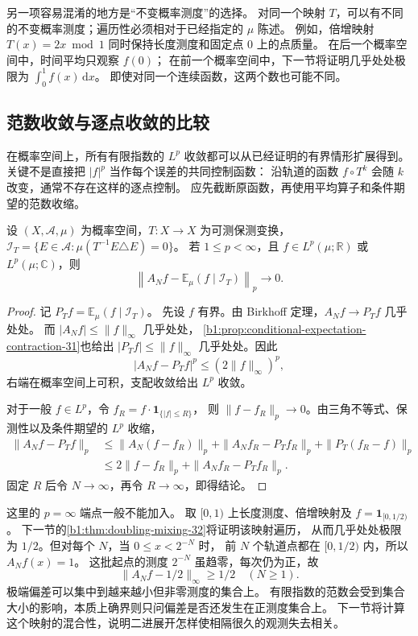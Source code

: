 另一项容易混淆的地方是“不变概率测度”的选择。
对同一个映射 \(T\)，可以有不同的不变概率测度；遍历性必须相对于已经指定的 \(\mu\) 陈述。
例如，倍增映射 \(T(x)=2x\bmod1\) 同时保持长度测度和固定点 \(0\) 上的点质量。
在后一个概率空间中，时间平均只观察 \(f(0)\)；
在前一个概率空间中，下一节将证明几乎处处极限为 \(\int_0^1f(x)\,\mathrm dx\)。
即使对同一个连续函数，这两个数也可能不同。

\subsection{范数收敛与逐点收敛的比较}
\label{b1:subsec:320404}

在概率空间上，所有有限指数的 \(L^p\) 收敛都可以从已经证明的有界情形扩展得到。
关键不是直接把 \(|f|^p\) 当作每个误差的共同控制函数：
沿轨道的函数 \(f\circ T^k\) 会随 \(k\) 改变，通常不存在这样的逐点控制。
应先截断原函数，再使用平均算子和条件期望的范数收缩。

\begin{proposition}[有限指数的范数收敛]
\label{b1:prop:ergodic-lp-32}
设 \((X,\mathcal A,\mu)\) 为概率空间，\(T:X\to X\) 为可测保测变换，
\(\mathcal I_T=\{E\in\mathcal A:\mu(T^{-1}E\triangle E)=0\}\)。
若 \(1\leq p<\infty\)，且 \(f\in L^p(\mu;\mathbb R)\) 或 \(L^p(\mu;\mathbb C)\)，则
\[
 \left\|A_Nf-\mathbb E_\mu(f\mid\mathcal I_T)\right\|_p
 \longrightarrow0.
\]
\end{proposition}
\begin{proof}
记 \(P_Tf=\mathbb E_\mu(f\mid\mathcal I_T)\)。
先设 \(f\) 有界。由 Birkhoff 定理，\(A_Nf\to P_Tf\) 几乎处处。
而 \(|A_Nf|\leq\|f\|_\infty\) 几乎处处，
\cref{b1:prop:conditional-expectation-contraction-31}也给出
\(|P_Tf|\leq\|f\|_\infty\) 几乎处处。因此
\[
 |A_Nf-P_Tf|^p\leq(2\|f\|_\infty)^p,
\]
右端在概率空间上可积，支配收敛给出 \(L^p\) 收敛。

对于一般 \(f\in L^p\)，令 \(f_R=f\cdot\mathbf1_{\{|f|\leq R\}}\)，
则 \(\|f-f_R\|_p\to0\)。由三角不等式、保测性以及条件期望的 \(L^p\) 收缩，
\[
 \begin{aligned}
 \|A_Nf-P_Tf\|_p
 &\leq\|A_N(f-f_R)\|_p
       +\|A_Nf_R-P_Tf_R\|_p+\|P_T(f_R-f)\|_p\\
 &\leq2\|f-f_R\|_p+\|A_Nf_R-P_Tf_R\|_p.
 \end{aligned}
\]
固定 \(R\) 后令 \(N\to\infty\)，再令 \(R\to\infty\)，即得结论。
\end{proof}

这里的 \(p=\infty\) 端点一般不能加入。
取 \([0,1)\) 上长度测度、倍增映射及 \(f=\mathbf1_{[0,1/2)}\)。
下一节的\cref{b1:thm:doubling-mixing-32}将证明该映射遍历，
从而几乎处处极限为 \(1/2\)。但对每个 \(N\)，当 \(0\leq x<2^{-N}\) 时，
前 \(N\) 个轨道点都在 \([0,1/2)\) 内，所以 \(A_Nf(x)=1\)。
这批起点的测度 \(2^{-N}\) 虽趋零，每次仍为正，故
\[
 \|A_Nf-1/2\|_\infty\geq1/2\quad(N\geq1).
\]
极端偏差可以集中到越来越小但非零测度的集合上。
有限指数的范数会受到集合大小的影响，本质上确界则只问偏差是否还发生在正测度集合上。
下一节将计算这个映射的混合性，说明二进展开怎样使相隔很久的观测失去相关。


